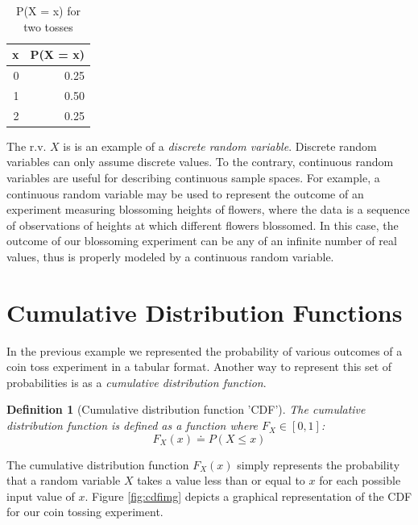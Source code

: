 \documentclass[
  12pt,
]{book}
\theoremstyle{definition}
\newtheorem{definition}{Definition}[chapter]
\theoremstyle{definition}
\theoremstyle{definition}
\theoremstyle{remark}
\begin{document}
\begin{table}[!h]

\caption{\label{tab:rv}P(X = x) for two tosses}
\centering
\begin{tabular}[t]{rr}
\toprule
x & P(X = x)\\
\midrule
0 & 0.25\\
1 & 0.50\\
2 & 0.25\\
\bottomrule
\end{tabular}
\end{table}

The r.v. \(X\) is is an example of a \emph{discrete random variable}.
Discrete random variables can only assume discrete values.
To the contrary, continuous random variables are useful for describing continuous sample spaces.
For example, a continuous random variable may be used to represent the outcome of an experiment measuring blossoming heights of flowers, where the data is a sequence of observations of heights at which different flowers blossomed.
In this case, the outcome of our blossoming experiment can be any of an infinite number of real values, thus is properly modeled by a continuous random variable.

\hypertarget{cumulative-distribution-functions}{%
\section{Cumulative Distribution Functions}\label{cumulative-distribution-functions}}

In the previous example we represented the probability of various outcomes of a coin toss experiment in a tabular format.
Another way to represent this set of probabilities is as a \emph{cumulative distribution function}.

\begin{definition}[Cumulative distribution function 'CDF']
\protect\hypertarget{def:cdf}{}{\label{def:cdf} {} }\emph{The cumulative distribution function is defined as a function where \(F_{X}\in[0, 1]\):}
\[F_{X}(x) \doteq P(X≤x)\]
\end{definition}

The cumulative distribution function \(F_{X}(x)\) simply represents the probability that a random variable \(X\) takes a value less than or equal to \(x\) for each possible input value of \(x\).
Figure \ref{fig:cdfimg} depicts a graphical representation of the CDF for our coin tossing experiment.
\end{document}
